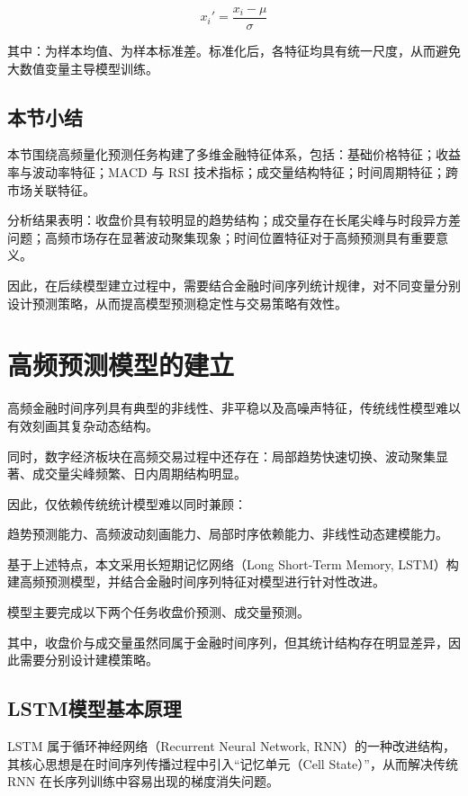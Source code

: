 \documentclass[withoutpreface,bwprint]{cumcmthesis}
\begin{document}
\begin{equation}
x_i'=\frac{x_i-\mu}{\sigma}
\end{equation}

其中：为样本均值、为样本标准差。标准化后，各特征均具有统一尺度，从而避免大数值变量主导模型训练。

\subsection{本节小结}

本节围绕高频量化预测任务构建了多维金融特征体系，包括：基础价格特征；收益率与波动率特征；MACD 与 RSI 技术指标；成交量结构特征；时间周期特征；跨市场关联特征。

分析结果表明：收盘价具有较明显的趋势结构；成交量存在长尾尖峰与时段异方差问题；高频市场存在显著波动聚集现象；时间位置特征对于高频预测具有重要意义。

因此，在后续模型建立过程中，需要结合金融时间序列统计规律，对不同变量分别设计预测策略，从而提高模型预测稳定性与交易策略有效性。

\section{高频预测模型的建立}

高频金融时间序列具有典型的非线性、非平稳以及高噪声特征，传统线性模型难以有效刻画其复杂动态结构。

同时，数字经济板块在高频交易过程中还存在：局部趋势快速切换、波动聚集显著、成交量尖峰频繁、日内周期结构明显。

因此，仅依赖传统统计模型难以同时兼顾：

趋势预测能力、高频波动刻画能力、局部时序依赖能力、非线性动态建模能力。

基于上述特点，本文采用长短期记忆网络（Long Short-Term Memory, LSTM）构建高频预测模型，并结合金融时间序列特征对模型进行针对性改进。

模型主要完成以下两个任务收盘价预测、成交量预测。

其中，收盘价与成交量虽然同属于金融时间序列，但其统计结构存在明显差异，因此需要分别设计建模策略。

\subsection{LSTM模型基本原理}

LSTM 属于循环神经网络（Recurrent Neural Network, RNN）的一种改进结构，其核心思想是在时间序列传播过程中引入“记忆单元（Cell State）”，从而解决传统 RNN 在长序列训练中容易出现的梯度消失问题。
\end{document}
